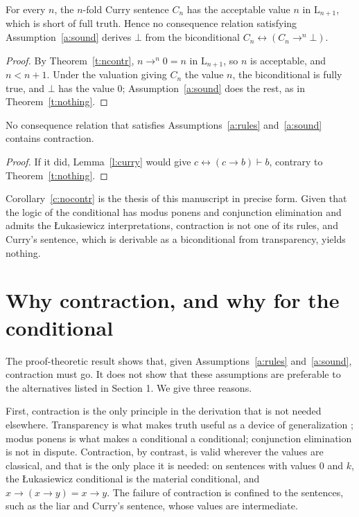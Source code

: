 \documentclass{situationist-preprint}
\begin{document}
\begin{theorem}\label{t:ncurry}
For every $n$, the $n$-fold Curry sentence $C_n$ has the acceptable value $n$ in $\mathrm{L}_{n+1}$, which is short of full truth. Hence no consequence relation satisfying Assumption~\ref{a:sound} derives $\bot$ from the biconditional $C_n \leftrightarrow (C_n \to^n \bot)$.
\end{theorem}

\begin{proof}
By Theorem~\ref{t:ncontr}, $n \to^n 0 = n$ in $\mathrm{L}_{n+1}$, so $n$ is acceptable, and $n < n + 1$. Under the valuation giving $C_n$ the value $n$, the biconditional is fully true, and $\bot$ has the value $0$; Assumption~\ref{a:sound} does the rest, as in Theorem~\ref{t:nothing}.
\end{proof}

\begin{corollary}\label{c:nocontr}
No consequence relation that satisfies Assumptions~\ref{a:rules} and~\ref{a:sound} contains contraction.
\end{corollary}

\begin{proof}
If it did, Lemma~\ref{l:curry} would give $c \leftrightarrow (c \to b) \vdash b$, contrary to Theorem~\ref{t:nothing}.
\end{proof}

Corollary~\ref{c:nocontr} is the thesis of this manuscript in precise form. Given that the logic of the conditional has modus ponens and conjunction elimination and admits the Łukasiewicz interpretations, contraction is not one of its rules, and Curry's sentence, which is derivable as a biconditional from transparency, yields nothing.

\section{Why contraction, and why for the conditional}\label{s:why}

The proof-theoretic result shows that, given Assumptions~\ref{a:rules} and~\ref{a:sound}, contraction must go. It does not show that these assumptions are preferable to the alternatives listed in Section 1. We give three reasons.

First, contraction is the only principle in the derivation that is not needed elsewhere. Transparency is what makes truth useful as a device of generalization \citep{Field2008}; modus ponens is what makes a conditional a conditional; conjunction elimination is not in dispute. Contraction, by contrast, is valid wherever the values are classical, and that is the only place it is needed: on sentences with values $0$ and $k$, the Łukasiewicz conditional is the material conditional, and $x \to (x \to y) = x \to y$. The failure of contraction is confined to the sentences, such as the liar and Curry's sentence, whose values are intermediate.
\end{document}
